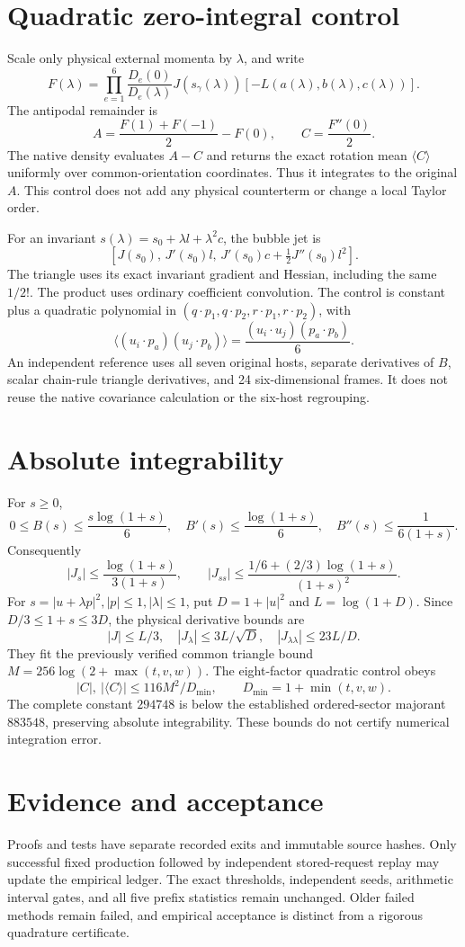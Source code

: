 \documentclass[11pt]{article}
\begin{document}
\section*{Quadratic zero-integral control}
Scale only physical external momenta by \(\lambda\), and write
\[
 F(\lambda)=
 \prod_{e=1}^{6}\frac{D_e(0)}{D_e(\lambda)}
 J(s_\gamma(\lambda))
 [-L(a(\lambda),b(\lambda),c(\lambda))].
\]
The antipodal remainder is
\[
 A=\frac{F(1)+F(-1)}2-F(0),\qquad C=\frac{F''(0)}2.
\]
The native density evaluates \(A-C\) and returns the exact rotation
mean \(\langle C\rangle\) uniformly over common-orientation
coordinates. Thus it integrates to the original \(A\). This control
does not add any physical counterterm or change a local Taylor order.

For an invariant \(s(\lambda)=s_0+\lambda l+\lambda^2c\),
the bubble jet is
\[
 [J(s_0),\,J'(s_0)l,\,J'(s_0)c+\tfrac12J''(s_0)l^2].
\]
The triangle uses its exact invariant gradient and Hessian, including
the same \(1/2!\). The product uses ordinary coefficient convolution.
The control is constant plus a quadratic polynomial in
\((q\cdot p_1,q\cdot p_2,r\cdot p_1,r\cdot p_2)\), with
\[
 \langle(u_i\cdot p_a)(u_j\cdot p_b)\rangle
 =\frac{(u_i\cdot u_j)(p_a\cdot p_b)}6.
\]
An independent reference uses all seven original hosts, separate
derivatives of \(B\), scalar chain-rule triangle derivatives, and
24 six-dimensional frames. It does not reuse the native covariance
calculation or the six-host regrouping.

\section*{Absolute integrability}
For \(s\geq0\),
\[
 0\leq B(s)\leq \frac{s\log(1+s)}6,\quad
 B'(s)\leq\frac{\log(1+s)}6,\quad B''(s)\leq\frac1{6(1+s)}.
\]
Consequently
\[
 |J_s|\leq\frac{\log(1+s)}{3(1+s)},\qquad
 |J_{ss}|\leq
 \frac{1/6+(2/3)\log(1+s)}{(1+s)^2}.
\]
For \(s=|u+\lambda p|^2, |p|\leq1,|\lambda|\leq1\), put
\(D=1+|u|^2\) and \(L=\log(1+D)\). Since
\(D/3\leq1+s\leq3D\), the physical derivative bounds are
\[
 |J|\leq L/3,\quad |J_\lambda|\leq3L/\sqrt D,\quad
 |J_{\lambda\lambda}|\leq23L/D.
\]
They fit the previously verified common triangle bound
\(M=256\log(2+\max(t,v,w))\).
The eight-factor quadratic control obeys
\[
 |C|,\ |\langle C\rangle|\leq116M^2/D_{\min},
 \qquad D_{\min}=1+\min(t,v,w).
\]
The complete constant \(294748\) is below the established
ordered-sector majorant \(883548\), preserving absolute integrability.
These bounds do not certify numerical integration error.

\section*{Evidence and acceptance}
Proofs and tests have separate recorded exits and immutable source
hashes. Only successful fixed production followed by independent
stored-request replay may update the empirical ledger.
The exact thresholds, independent seeds, arithmetic interval gates,
and all five prefix statistics remain unchanged.
Older failed methods remain failed, and empirical acceptance is
distinct from a rigorous quadrature certificate.
\end{document}
